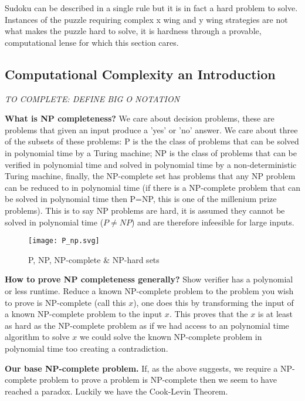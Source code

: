 \documentclass[a4paper,12pt]{article}
\begin{document}
		Sudoku can be described in a single rule but it is in fact a hard problem to solve.
		Instances of the puzzle requiring complex x wing and y wing strategies are not what makes the puzzle hard to solve,
		it is hardness through a provable, computational lense for which this section cares. 
		
	\subsection{Computational Complexity an Introduction}
	
	 \textit{TO COMPLETE: DEFINE BIG O NOTATION}
	 
		\textbf{What is NP completeness?}
		We care about decision problems, these are problems that given an input  produce a 'yes' or 'no' answer. We care about three of the subsets of these problems: P is the the class of problems that can be solved in polynomial time by a Turing machine; NP is the class of problems that can be verified in polynomial time and solved in polynomial time by a non-deterministic Turing machine, finally, the NP-complete set has problems that any NP problem can be reduced to in polynomial time (if there is a NP-complete problem that can be solved in polynomial time then P=NP, this is one of the millenium prize problems).
		This is to say NP problems are hard, it is assumed they cannot be solved in polynomial time ($P \neq NP$) and are therefore infeesible for large inputs.

\begin{figure}[h!]
	\begin{center}
		\texttt{[image: P\_np.svg]}
	\end{center}
	\caption{P, NP, NP-complete \& NP-hard sets \cite{P_NP_Figure}}
\end{figure}

		\textbf{How to prove NP completeness generally?}
		Show verifier has a polynomial or less runtime.
		Reduce a known NP-complete problem to the problem you wish to prove is NP-complete (call this $x$), one does this by transforming the input of a known NP-complete problem to the input $x$. This proves that the $x$ is at least as hard as the NP-complete problem as if we had access to an polynomial time algorithm to solve $x$ we could solve the known NP-complete problem in polynomial time too creating a contradiction.

\textbf{Our base NP-complete problem.} If, as the above suggests, we require a NP-complete problem to prove a problem is NP-complete then we seem to have reached a paradox. Luckily we have the Cook-Levin Theorem.
\end{document}
